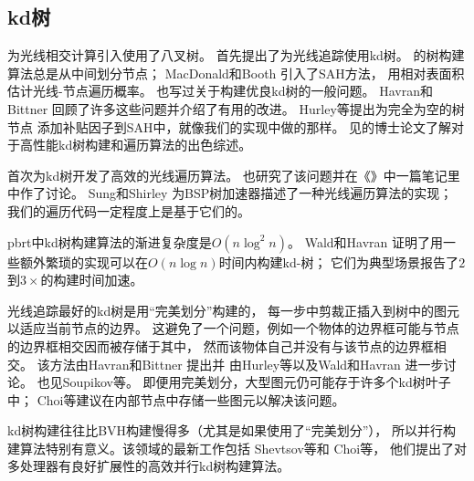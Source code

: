 \subsection{kd树}\label{sub:kd树}
\citet{6429331}为光线相交计算引入使用了八叉树。
\citet{kaplan1985use}首先提出了为光线追踪使用kd树。
\citeauthor{kaplan1985use}的树构建算法总是从中间划分节点；
MacDonald和Booth \parencite*{MacDonald1990}引入了SAH方法，
用相对表面积估计光线-节点遍历概率。
\citet{Naylor1993:27}也写过关于构建优良kd树的一般问题。
Havran和Bittner \parencite*{HavranImproving2002}回顾了许多这些问题并介绍了有用的改进。
Hurley等\parencite*{hurley2002fast}提出为完全为空的树节点
添加补贴因子到SAH中，就像我们的实现中做的那样。
见\citet{Havran2000:PhD}的博士论文了解对于高性能kd树构建和遍历算法的出色综述。


\citet{10.1007/978-3-642-71071-1_4}首次为kd树开发了高效的光线遍历算法。
\citet{ArvoRay1988}也研究了该问题并在《{\itshape{}}》中一篇笔记里中作了讨论。
Sung和Shirley \parencite*{SUNG1992271}为BSP树加速器描述了一种光线遍历算法的实现；
我们的遍历代码一定程度上是基于它们的。

pbrt中kd树构建算法的渐进复杂度是$O(n\log^2n)$。
Wald和Havran \parencite*{4061547}证明了用一些额外繁琐的实现可以在$O(n\log n)$时间内构建kd-树；
它们为典型场景报告了$2$到$3\times$的构建时间加速。

光线追踪最好的kd树是用“完美划分”构建的，
每一步中剪裁正插入到树中的图元以适应当前节点的边界。
这避免了一个问题，例如一个物体的边界框可能与节点的边界框相交因而被存储于其中，
然而该物体自己并没有与该节点的边界框相交。
该方法由Havran和Bittner \parencite*{HavranImproving2002}提出并
由Hurley等\parencite*{hurley2002fast}以及Wald和Havran \parencite*{4061547}进一步讨论。
也见Soupikov等\parencite*{4634623}。
即便用完美划分，大型图元仍可能存于许多个kd树叶子中；
Choi等\parencite*{10.1111/cgf.12241}建议在内部节点中存储一些图元以解决该问题。

kd树构建往往比BVH构建慢得多（尤其是如果使用了“完美划分”），
所以并行构建算法特别有意义。该领域的最新工作包括
Shevtsov等\parencite*{10.1111/j.1467-8659.2007.01062.x}和
Choi等\parencite*{10.5555/1921479.1921492}，
他们提出了对多处理器有良好扩展性的高效并行kd树构建算法。

